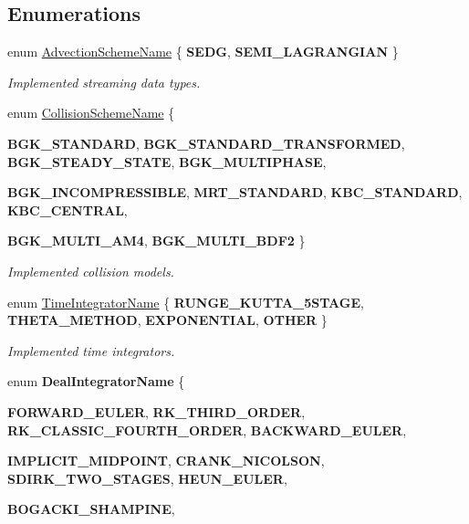 \subsection*{Enumerations}
\begin{DoxyCompactItemize}
\item 
enum \hyperlink{namespacenatrium_ab73faf50bccace063cee6f66b5af2b02}{AdvectionSchemeName} \{ {\bfseries SEDG}, 
{\bfseries SEMI\_\-LAGRANGIAN}
 \}
\begin{DoxyCompactList}\small\item\em Implemented streaming data types. \item\end{DoxyCompactList}\item 
enum \hyperlink{namespacenatrium_a77a27ea835db291372b246db6b4b1578}{CollisionSchemeName} \{ \par
{\bfseries BGK\_\-STANDARD}, 
{\bfseries BGK\_\-STANDARD\_\-TRANSFORMED}, 
{\bfseries BGK\_\-STEADY\_\-STATE}, 
{\bfseries BGK\_\-MULTIPHASE}, 
\par
{\bfseries BGK\_\-INCOMPRESSIBLE}, 
{\bfseries MRT\_\-STANDARD}, 
{\bfseries KBC\_\-STANDARD}, 
{\bfseries KBC\_\-CENTRAL}, 
\par
{\bfseries BGK\_\-MULTI\_\-AM4}, 
{\bfseries BGK\_\-MULTI\_\-BDF2}
 \}
\begin{DoxyCompactList}\small\item\em Implemented collision models. \item\end{DoxyCompactList}\item 
enum \hyperlink{namespacenatrium_a00a0ec1e80f138680e0fcca78349f6d8}{TimeIntegratorName} \{ {\bfseries RUNGE\_\-KUTTA\_\-5STAGE}, 
{\bfseries THETA\_\-METHOD}, 
{\bfseries EXPONENTIAL}, 
{\bfseries OTHER}
 \}
\begin{DoxyCompactList}\small\item\em Implemented time integrators. \item\end{DoxyCompactList}\item 
enum {\bfseries DealIntegratorName} \{ \par
{\bfseries FORWARD\_\-EULER}, 
{\bfseries RK\_\-THIRD\_\-ORDER}, 
{\bfseries RK\_\-CLASSIC\_\-FOURTH\_\-ORDER}, 
{\bfseries BACKWARD\_\-EULER}, 
\par
{\bfseries IMPLICIT\_\-MIDPOINT}, 
{\bfseries CRANK\_\-NICOLSON}, 
{\bfseries SDIRK\_\-TWO\_\-STAGES}, 
{\bfseries HEUN\_\-EULER}, 
\par
{\bfseries BOGACKI\_\-SHAMPINE}, 

\end{DoxyCompactItemize}
